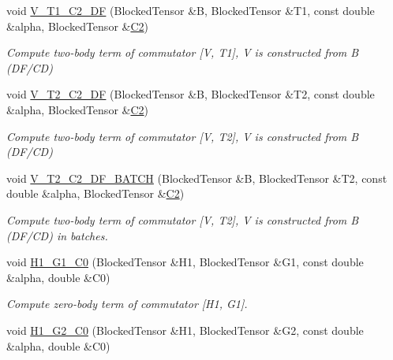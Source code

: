 \begin{DoxyCompactItemize}
void \mbox{\hyperlink{classforte_1_1_m_a_s_t_e_r___d_s_r_g_abfca3ef3d6257c2a1229447dbe88680c}{V\+\_\+\+T1\+\_\+\+C2\+\_\+\+DF}} (Blocked\+Tensor \&B, Blocked\+Tensor \&T1, const double \&alpha, Blocked\+Tensor \&\mbox{\hyperlink{namespaceforte_abe00ec86d0015c0f2b6ac298c6e428e4af1a543f5a2c5d49bc5dde298fcf716e4}{C2}})
\begin{DoxyCompactList}\small\item\em Compute two-\/body term of commutator \mbox{[}V, T1\mbox{]}, V is constructed from B (D\+F/\+CD) \end{DoxyCompactList}\item 
void \mbox{\hyperlink{classforte_1_1_m_a_s_t_e_r___d_s_r_g_a0bfabeece8f51cb195b55757c86b562e}{V\+\_\+\+T2\+\_\+\+C2\+\_\+\+DF}} (Blocked\+Tensor \&B, Blocked\+Tensor \&T2, const double \&alpha, Blocked\+Tensor \&\mbox{\hyperlink{namespaceforte_abe00ec86d0015c0f2b6ac298c6e428e4af1a543f5a2c5d49bc5dde298fcf716e4}{C2}})
\begin{DoxyCompactList}\small\item\em Compute two-\/body term of commutator \mbox{[}V, T2\mbox{]}, V is constructed from B (D\+F/\+CD) \end{DoxyCompactList}\item 
void \mbox{\hyperlink{classforte_1_1_m_a_s_t_e_r___d_s_r_g_a09d201c4c4009d9552328360fc175f28}{V\+\_\+\+T2\+\_\+\+C2\+\_\+\+D\+F\+\_\+\+B\+A\+T\+CH}} (Blocked\+Tensor \&B, Blocked\+Tensor \&T2, const double \&alpha, Blocked\+Tensor \&\mbox{\hyperlink{namespaceforte_abe00ec86d0015c0f2b6ac298c6e428e4af1a543f5a2c5d49bc5dde298fcf716e4}{C2}})
\begin{DoxyCompactList}\small\item\em Compute two-\/body term of commutator \mbox{[}V, T2\mbox{]}, V is constructed from B (D\+F/\+CD) in batches. \end{DoxyCompactList}\item 
void \mbox{\hyperlink{classforte_1_1_m_a_s_t_e_r___d_s_r_g_a6f2f3067147bde13e729d4cac28d0dcc}{H1\+\_\+\+G1\+\_\+\+C0}} (Blocked\+Tensor \&H1, Blocked\+Tensor \&G1, const double \&alpha, double \&C0)
\begin{DoxyCompactList}\small\item\em Compute zero-\/body term of commutator \mbox{[}H1, G1\mbox{]}. \end{DoxyCompactList}\item 
void \mbox{\hyperlink{classforte_1_1_m_a_s_t_e_r___d_s_r_g_a63ef83789ae2375d729a4a6e47cd439d}{H1\+\_\+\+G2\+\_\+\+C0}} (Blocked\+Tensor \&H1, Blocked\+Tensor \&G2, const double \&alpha, double \&C0)

\end{DoxyCompactItemize}
